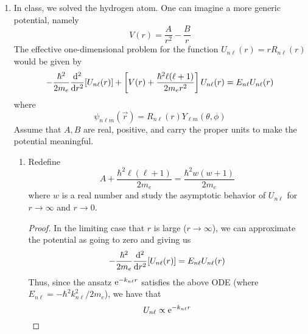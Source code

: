 \documentclass[../psets.tex]{subfiles}
\begin{document}
\begin{enumerate}
\begin{enumerate}
\begin{proof}
        \end{proof}
    \end{enumerate}
    \item In class, we solved the hydrogen atom. One can imagine a more generic potential, namely
    \begin{equation}
        V(r) = \frac{A}{r^2}-\frac{B}{r}
    \end{equation}
    The effective one-dimensional problem for the function $U_{n\ell}(r)=rR_{n\ell}(r)$ would be given by
    \begin{equation}
        -\frac{\hbar^2}{2m_e}\dv[2]{r}[U_{n\ell}(r)]+\left[ V(r)+\frac{\hbar^2\ell(\ell+1)}{2m_er^2} \right]U_{n\ell}(r) = E_{n\ell}U_{n\ell}(r)
    \end{equation}
    where
    \begin{equation}
        \psi_{n\ell m}(\vec{r}) = R_{n\ell}(r)Y_{\ell m}(\theta,\phi)
    \end{equation}
    Assume that $A,B$ are real, positive, and carry the proper units to make the potential meaningful.
    \begin{enumerate}
        \item Redefine
        \begin{equation}
            A+\frac{\hbar^2\ell(\ell+1)}{2m_e} = \frac{\hbar^2w(w+1)}{2m_e}
        \end{equation}
        where $w$ is a real number and study the asymptotic behavior of $U_{n\ell}$ for $r\to\infty$ and $r\to 0$.
        \begin{proof}
            In the limiting case that $r$ is large ($r\to\infty$), we can approximate the potential as going to zero and giving us
            \begin{equation*}
                -\frac{\hbar^2}{2m_e}\dv[2]{r}[U_{n\ell}(r)] = E_{n\ell}U_{n\ell}(r)
            \end{equation*}
            Thus, since the ansatz $\e[-k_{n\ell}r]$ satisfies the above ODE (where $E_{n\ell}=-\hbar^2k_{n\ell}^2/2m_e$), we have that
            \begin{equation*}
                U_{n\ell} \propto \e[-k_{n\ell}r]
            \end{equation*}

\end{proof}
\end{enumerate}
\end{enumerate}
\end{document}
